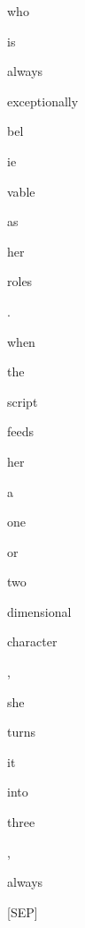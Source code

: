 \documentclass[varwidth=150mm]{standalone}
\begin{document}
\begin{CJK*}{UTF8}{gbsn}
{{{\colorbox{red!6.773181438446045}{\strut who} \colorbox{red!4.813413619995117}{\strut is} \colorbox{red!5.1256022453308105}{\strut always} \colorbox{red!4.363315105438232}{\strut exceptionally} \colorbox{red!1.3554006814956665}{\strut bel}\colorbox{red!0.0}{\strut ie}\colorbox{red!2.012739658355713}{\strut vable} \colorbox{red!0.0}{\strut as} \colorbox{red!3.03936767578125}{\strut her} \colorbox{red!7.889014720916748}{\strut roles} \colorbox{red!0.0}{\strut .} \colorbox{red!1.1322656869888306}{\strut when} \colorbox{red!1.323004126548767}{\strut the} \colorbox{red!4.238251209259033}{\strut script} \colorbox{red!3.0385613441467285}{\strut feeds} \colorbox{red!2.8009397983551025}{\strut her} \colorbox{red!0.0}{\strut a} \colorbox{red!0.0}{\strut one} \colorbox{red!1.7420718669891357}{\strut or} \colorbox{red!0.0}{\strut two} \colorbox{red!5.549309253692627}{\strut dimensional} \colorbox{red!1.934810996055603}{\strut character} \colorbox{red!0.0}{\strut ,} \colorbox{red!9.607933044433594}{\strut she} \colorbox{red!0.0}{\strut turns} \colorbox{red!0.0}{\strut it} \colorbox{red!1.1116968393325806}{\strut into} \colorbox{red!3.981330394744873}{\strut three} \colorbox{red!27.91715431213379}{\strut ,} \colorbox{red!9.139754295349121}{\strut always} \colorbox{red!2.3093152046203613}{\strut [SEP]}
}}}
\end{CJK*}
\end{document}

